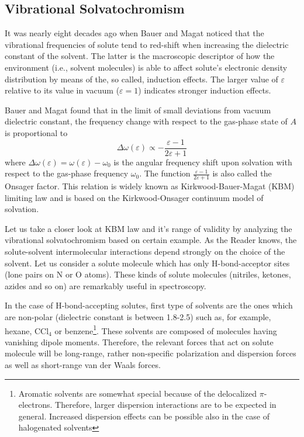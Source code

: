 \documentclass[a4paper,titlepage,twoside,fleqn,12pt]{book}
\begin{document}
\begin{refsection}
\chapter{Vibrational Solvatochromism}

It was nearly eight decades ago when Bauer and Magat noticed 
that the vibrational frequencies
of solute tend to red-shift when
increasing the dielectric constant of the solvent.\citep{Bauer.Magat.JPhysRadium.1938} 
The latter is the macroscopic descriptor 
of how the environment (i.e., solvent molecules) is able to affect solute's 
electronic density distribution by means of the, so called, induction
effects. The larger value of $\varepsilon$ relative to its value in vacuum
($\varepsilon=1$) indicates stronger induction effects. 

Bauer and Magat found that in the limit of small deviations
from vacuum dielectric constant, the frequency change with respect to the
gas-phase state of $A$ is proportional to
%
\begin{equation} \label{e:kbm}
\Delta \omega(\varepsilon) \propto - \frac{\varepsilon-1}{2\varepsilon+1}
\end{equation}
%
where $\Delta\omega(\varepsilon) = \omega(\varepsilon) - \omega_0$ is the
angular frequency shift upon solvation with respect to the gas-phase frequency
$\omega_0$. The function $\frac{\varepsilon-1}{2\varepsilon+1}$ is also called
the Onsager factor. This relation is widely known as Kirkwood-Bauer-Magat (KBM) 
limiting law and is based on the Kirkwood-Onsager continuum model of 
solvation.\citep{Kirkwood.JCP.1934,Onsager.JACS.1936}

Let us take a closer look at KBM law and it's range of validity by analyzing the vibrational
solvatochromism based on certain example. As the Reader knows, the solute-solvent intermolecular interactions 
depend strongly on the choice of the solvent.\citep{Stone.TheTheoryOfIntermolecularForces.1996,Gutmann.Resch.Linert.CoordChemRev.1982} 
Let us consider a solute molecule which has
only H-bond-acceptor sites (lone pairs on N or O atoms). These kinds of solute molecules
(nitriles, ketones, azides and so on) are remarkably useful in spectroscopy.

In the case of H-bond-accepting solutes, first type of solvents are the ones
which are non-polar (dielectric constant is between 1.8-2.5) such as, for example,
hexane, CCl$_4$ or benzene\footnote{Aromatic solvents are somewhat special because 
of the delocalized $\pi$-electrons. Therefore, larger dispersion interactions are to be expected in general.
Increased dispersion effects can be possible also in the case of halogenated solvents}. 
These solvents are composed
of molecules having vanishing dipole moments. Therefore, the relevant forces that act on
solute molecule will be long-range, rather non-specific polarization and dispersion
forces as well as short-range van der Waals forces. 


\end{refsection}
\end{document}
